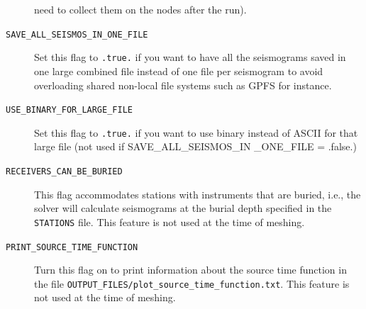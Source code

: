 \documentclass[oneside,english]{book}
\begin{document}
\begin{description}
need to collect them on the nodes after the run).
\item [{\texttt{SAVE\_ALL\_SEISMOS\_IN\_ONE\_FILE}}] Set this flag to \texttt{.true.}
if you want to have all the seismograms saved in one large combined
file instead of one file per seismogram to avoid overloading shared
non-local file systems such as GPFS for instance.
\item [{\texttt{USE\_BINARY\_FOR\_LARGE\_FILE}}] Set this flag to \texttt{.true.}
if you want to use binary instead of ASCII for that large file (not
used if SAVE\_ALL\_SEISMOS\_IN \_ONE\_FILE = .false.)
\item [{\texttt{RECEIVERS\_CAN\_BE\_BURIED}}] This flag accommodates stations
with instruments that are buried, i.e., the solver will calculate
seismograms at the burial depth specified in the \texttt{STATIONS}
file. This feature is not used at the time of meshing.
\item [{\texttt{PRINT\_SOURCE\_TIME\_FUNCTION}}] Turn this flag on to print
information about the source time function in the file \texttt{OUTPUT\_FILES/plot\_source\_time\_function.txt}.
This feature is not used at the time of meshing.
\end{description}
%
\clearpage
\end{document}
